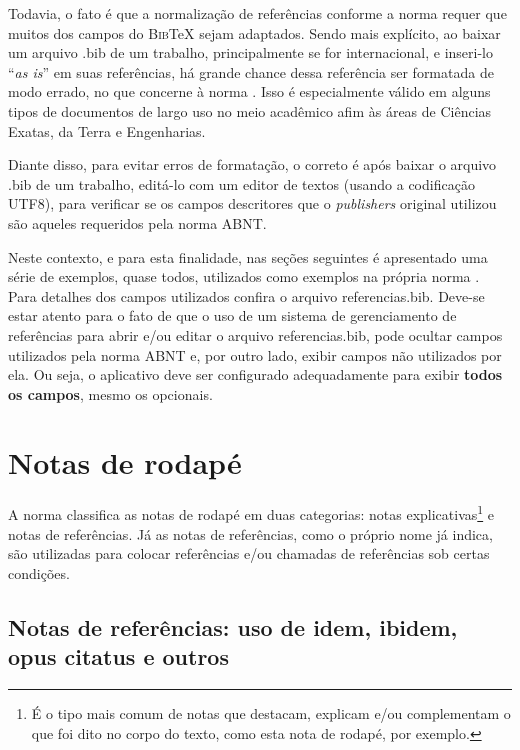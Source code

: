 \begin{apendicesenv}
    Todavia, o fato é que a normalização de referências conforme a norma  requer que muitos dos campos do \textsc{Bib}\TeX{} sejam adaptados.
    Sendo mais explícito, ao baixar um arquivo {\color{red} .bib} de um trabalho, principalmente se for internacional, e inseri-lo ``\textit{as is}'' em suas referências, há grande chance dessa referência ser formatada de modo errado, no que concerne à norma .
    Isso é especialmente válido em alguns tipos de documentos de largo uso no meio acadêmico afim às áreas de Ciências Exatas, da Terra e Engenharias.

    Diante disso, para evitar erros de formatação, o correto é após baixar o arquivo {\color{red} .bib} de um trabalho, editá-lo com um editor de textos (usando a codificação UTF8), para verificar se os campos descritores que o \textit{publishers} original utilizou são aqueles requeridos pela norma ABNT.

    Neste contexto, e para esta finalidade, nas seções seguintes é apresentado uma série de exemplos, quase todos, utilizados como exemplos na própria norma .
    Para detalhes dos campos utilizados confira o arquivo {\color{red} referencias.bib}.
    Deve-se estar atento para o fato de que o uso de um sistema de gerenciamento de referências para abrir e/ou editar o arquivo {\color{red} referencias.bib}, pode ocultar campos utilizados pela norma ABNT e, por outro lado, exibir campos não utilizados por ela.
    Ou seja, o aplicativo deve ser configurado adequadamente para exibir \textbf{todos os campos}, mesmo os opcionais.

    \section{Notas de rodapé}
    \label{sec_notas_de_rodape}

    A norma  classifica as notas de rodapé em duas categorias: notas explicativas\footnote{É o tipo mais comum de notas que destacam, explicam e/ou complementam o que foi dito no corpo do texto, como esta nota de rodapé, por exemplo.} e notas de referências.
    Já as notas de referências, como o próprio nome já indica, são utilizadas para colocar referências e/ou chamadas de referências sob certas condições\footnotemark{}.


    \subsection{Notas de referências: uso de idem, ibidem, opus citatus e outros}
    \label{subsec_notas_de_referencias}


\end{apendicesenv}
